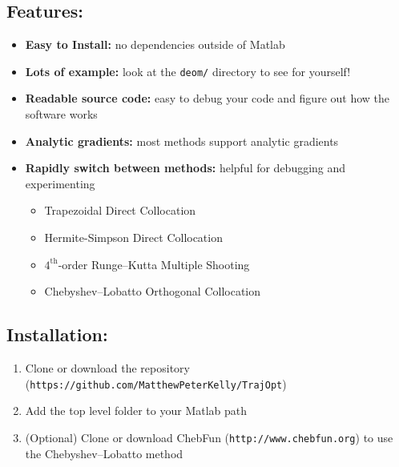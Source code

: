 \cite{Betts2010}

\subsection{Features:}
\begin{itemize} \setlength\itemsep{-0.1em}
\item {\bf Easy to Install: } no dependencies outside of Matlab \footnotemark
\item {\bf Lots of example: } look at the \texttt{deom/} directory to see for yourself!
\item {\bf Readable source code: } easy to debug your code and figure out how the software works
\item {\bf Analytic gradients: } most methods support analytic gradients
\item {\bf Rapidly switch between methods: } helpful for debugging and experimenting
 	\begin{itemize} \setlength\itemsep{-0.1em}
 	\item Trapezoidal Direct Collocation
 	\item Hermite-Simpson Direct Collocation
 	\item $4^\text{th}$-order Runge--Kutta Multiple Shooting
 	\item Chebyshev--Lobatto Orthogonal Collocation 
 	\end{itemize}
\end{itemize}

\subsection{Installation:}
\begin{enumerate} \setlength\itemsep{-0.1em}
\item Clone or download the repository (\texttt{https://github.com/MatthewPeterKelly/TrajOpt})
\item Add the top level folder to your Matlab path
\item (Optional) Clone or download ChebFun (\texttt{http://www.chebfun.org}) to use the Chebyshev--Lobatto method
\end{enumerate}

